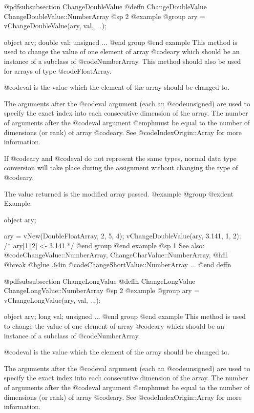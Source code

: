 @pdfsubsubsection {ChangeDoubleValue}
@deffn {ChangeDoubleValue} ChangeDoubleValue::NumberArray
@sp 2
@example
@group
ary = vChangeDoubleValue(ary, val, ...);

object    ary;
double    val;
unsigned  ...
@end group
@end example
This method is used to change the value of one element of
array @code{ary} which should be an instance of a subclass of
@code{NumberArray}.  This method should also be used for
arrays of type @code{FloatArray}.

@code{val} is the value which the element of the array should be changed
to.  

The arguments after the @code{val} argument (each an @code{unsigned})
are used to specify the exact index into each consecutive dimension of
the array.  The number of arguments after the @code{val} argument
@emph{must} be equal to the number of dimensions (or rank) of array
@code{ary}.  See @code{IndexOrigin::Array} for more information.

If @code{ary} and @code{val} do not represent the same types, normal
data type conversion will take place during the assignment without
changing the type of @code{ary}.

The value returned is the modified array passed.
@example
@group
@exdent Example:

object  ary;

ary = vNew(DoubleFloatArray, 2, 5, 4);
vChangeDoubleValue(ary, 3.141, 1, 2);
/*  ary[1][2] <- 3.141  */
@end group
@end example
@sp 1
See also:  @code{ChangeValue::NumberArray, ChangeCharValue::NumberArray,}
@hfil @break @hglue .64in @code{ChangeShortValue::NumberArray}  ...
@end deffn









@pdfsubsubsection {ChangeLongValue}
@deffn {ChangeLongValue} ChangeLongValue::NumberArray
@sp 2
@example
@group
ary = vChangeLongValue(ary, val, ...);

object    ary;
long      val;
unsigned  ...
@end group
@end example
This method is used to change the value of one element of
array @code{ary} which should be an instance of a subclass of
@code{NumberArray}.

@code{val} is the value which the element of the array should be changed
to.  

The arguments after the @code{val} argument (each an @code{unsigned})
are used to specify the exact index into each consecutive dimension of
the array.  The number of arguments after the @code{val} argument
@emph{must} be equal to the number of dimensions (or rank) of array
@code{ary}.  See @code{IndexOrigin::Array} for more information.

